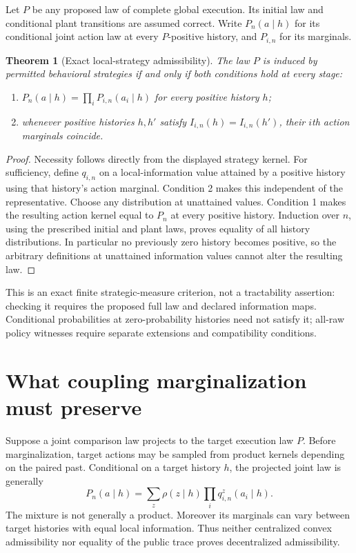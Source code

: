 \documentclass[11pt]{article}
\newtheorem{theorem}{Theorem}\newtheorem{proposition}{Proposition}
\begin{document}
Let $P$ be any proposed law of complete global execution. Its initial law and conditional plant transitions are assumed correct. Write $P_n(a\mid h)$ for its conditional joint action law at every $P$-positive history, and $P_{i,n}$ for its marginals.

\begin{theorem}[Exact local-strategy admissibility]
The law $P$ is induced by permitted behavioral strategies if and only if both conditions hold at every stage:
\begin{enumerate}
\item $P_n(a\mid h)=\prod_i P_{i,n}(a_i\mid h)$ for every positive history $h$;
\item whenever positive histories $h,h'$ satisfy $I_{i,n}(h)=I_{i,n}(h')$, their $i$th action marginals coincide.
\end{enumerate}
\end{theorem}
\begin{proof}
Necessity follows directly from the displayed strategy kernel. For sufficiency, define $q_{i,n}$ on a local-information value attained by a positive history using that history's action marginal. Condition 2 makes this independent of the representative. Choose any distribution at unattained values. Condition 1 makes the resulting action kernel equal to $P_n$ at every positive history. Induction over $n$, using the prescribed initial and plant laws, proves equality of all history distributions. In particular no previously zero history becomes positive, so the arbitrary definitions at unattained information values cannot alter the resulting law.
\end{proof}

This is an exact finite strategic-measure criterion, not a tractability assertion: checking it requires the proposed full law and declared information maps. Conditional probabilities at zero-probability histories need not satisfy it; all-raw policy witnesses require separate extensions and compatibility conditions.

\section{What coupling marginalization must preserve}
Suppose a joint comparison law projects to the target execution law $P$. Before marginalization, target actions may be sampled from product kernels depending on the paired past. Conditional on a target history $h$, the projected joint law is generally
\[
 P_n(a\mid h)=\sum_z\rho(z\mid h)\prod_i q^z_{i,n}(a_i\mid h).
\]
The mixture is not generally a product. Moreover its marginals can vary between target histories with equal local information. Thus neither centralized convex admissibility nor equality of the public trace proves decentralized admissibility.
\end{document}
